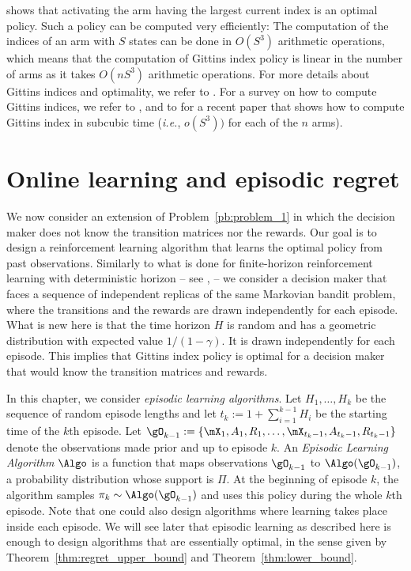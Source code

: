 \cite{gittins1979bandit} shows that activating
the arm having the largest current index is an optimal policy. Such a policy
can be computed very efficiently: The computation of the indices of an arm
with $S$ states can be done in \(O(S^3)\) arithmetic operations, which means
that the computation of Gittins index policy is linear in the number of arms
as it takes \(O(nS^3)\) arithmetic operations.
For more details about Gittins indices and optimality, we refer to
\cite{gittins2011multi,weber1992gittins}. For a survey on how to
compute Gittins indices, we refer to \cite{chakravorty2014multi}, and to \cite{gast2022computing} for a recent paper that shows how to compute Gittins index in subcubic time (\emph{i.e.}, $o(S^3))$ for each of the $n$ arms).

\section{Online learning and episodic regret}
\label{sec:problem}

We now consider an extension of Problem~\ref{pb:problem_1} in which the decision maker does not know the transition matrices
nor the rewards. Our goal is to design a reinforcement learning algorithm that
learns the optimal policy from past observations.  Similarly to what is done
for finite-horizon reinforcement learning with deterministic horizon -- see
\eg, \cite{zanette2019tighter,jin2018q,azar2017minimax,osband2013more} --
we consider a decision maker that faces a sequence of independent replicas of
the same Markovian bandit problem, where the transitions and the rewards 
are drawn independently for each episode.
What is new here is that  the time horizon $H$ is random and has a geometric distribution with expected value $1/(1-\gamma)$. It is drawn  independently for each episode. This implies that Gittins index policy is optimal for a decision maker that would know the transition matrices and rewards.

In this chapter, we consider \emph{episodic learning algorithms}. Let
$H_1,\ldots, H_k$ be the sequence of random episode lengths and let
$t_k:=1{+}\sum_{i=1}^{k-1}H_i$ be the starting time of the $k$th episode. Let 
\(\gO_{k-1}:=\{\mX_1,A_1,R_1,\dots,\mX_{t_k-1},A_{t_k-1},R_{t_k-1}\}\) denote
the observations made prior and up to episode \(k\). An \emph{Episodic Learning
Algorithm} \(\Algo\) is a function that maps observations \(\gO_{k-1}\) to
\(\Algo(\gO_{k-1})\), a probability distribution whose support is $\Pi$.  At the
beginning of episode $k$, the algorithm samples \(\pi_k\sim\Algo(\gO_{k-1})\)
and uses this policy during the whole $k$th episode. Note that one could also
design algorithms where learning takes place inside each episode. We will see
later that episodic learning as described here is enough to design algorithms
that are essentially optimal, in the sense given by Theorem~\ref{thm:regret_upper_bound} and Theorem~\ref{thm:lower_bound}.

